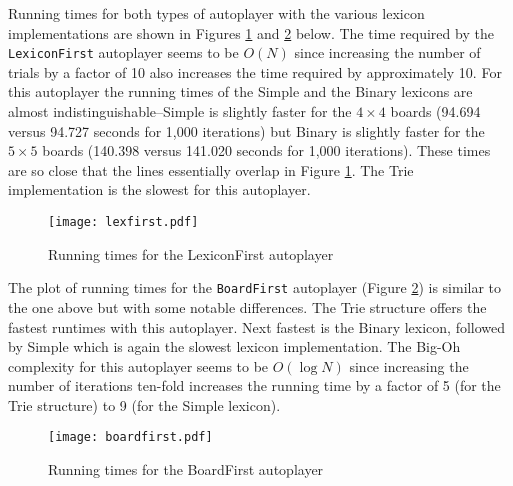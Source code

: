 \documentclass[12pt]{article}
\begin{document}
Running times for both types of autoplayer with the various lexicon implementations are shown in Figures \ref{lexfirst} and \ref{boardfirst} below. The time required by the \texttt{LexiconFirst} autoplayer seems to be $O(N)$ since increasing the number of trials by a factor of 10 also increases the time required by approximately 10. For this autoplayer the running times of the Simple and the Binary lexicons are almost indistinguishable--Simple is slightly faster for the $4 \times 4$ boards (94.694 versus 94.727 seconds for 1,000 iterations) but Binary is slightly faster for the $5 \times 5$ boards (140.398 versus 141.020 seconds for 1,000 iterations). These times are so close that the lines essentially overlap in Figure \ref{lexfirst}. The Trie implementation is the slowest for this autoplayer. 

\begin{figure}[h!]
\begin{center}
\texttt{[image: lexfirst.pdf]}
\end{center}
\caption{Running times for the LexiconFirst autoplayer}
\label{lexfirst}
\end{figure}

The plot of running times for the \texttt{BoardFirst} autoplayer (Figure \ref{boardfirst}) is similar to the one above  but with some notable differences. The Trie structure offers the fastest runtimes with this autoplayer. Next fastest is the Binary lexicon, followed by Simple which is again the slowest lexicon implementation. The Big-Oh complexity for this autoplayer seems to be $O(\log N)$ since increasing the number of iterations ten-fold increases the running time by a factor of 5 (for the Trie structure) to 9 (for the Simple lexicon). 

\begin{figure}[h!]
\begin{center}
\texttt{[image: boardfirst.pdf]}
\end{center}
\caption{Running times for the BoardFirst autoplayer}
\label{boardfirst}
\end{figure}
\end{document}

